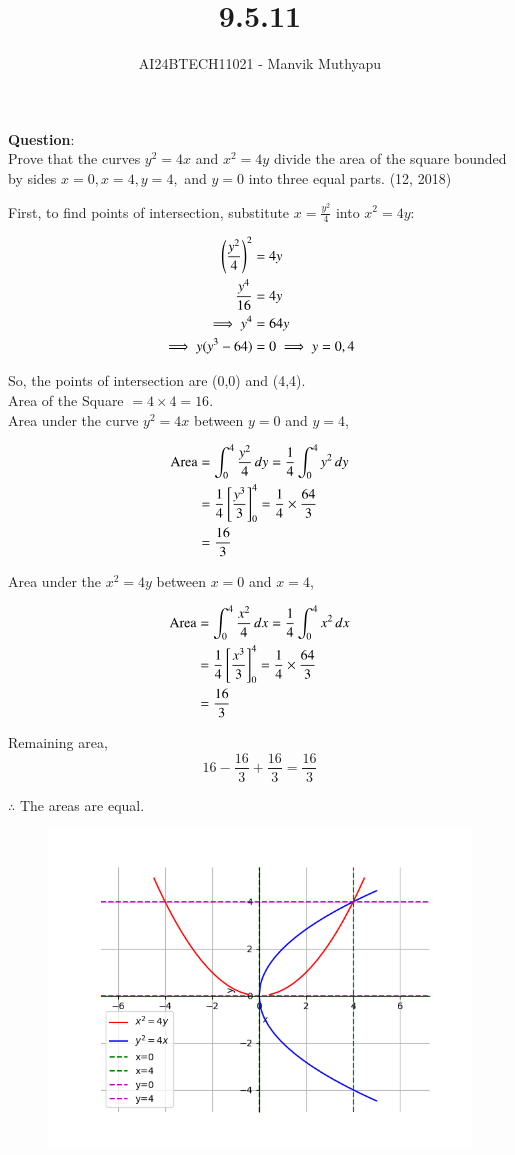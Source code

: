 \documentclass[journal,12pt,onecolumn]{IEEEtran}
\title{9.5.11}
\author{AI24BTECH11021 - Manvik Muthyapu}
\theoremstyle{remark}
\begin{document}


\maketitle
\bigskip

\renewcommand{\thefigure}{\theenumi}
\renewcommand{\thetable}{\theenumi}


\textbf{Question}:\\
Prove that the curves $y^2 = 4x$ and $x^2 = 4y$ divide the area of the square bounded by sides $x=0, x=4, y=4,$ and $y=0$ into three equal parts.
\hfill{(12, 2018)}

\solution
First, to find points of intersection, substitute $x = \frac{y^2}{4}$ into $x^2 = 4y$:

\begin{align}
	\left(\frac{y^2}{4}\right)^2 &= 4y \\
	\frac{y^4}{16} &= 4y \\
	\implies y^4 &= 64y \\
	\implies y(y^3 - 64) &= 0 \implies y = 0,4
\end{align}

So, the points of intersection are (0,0) and (4,4). \\
Area of the Square $= 4 \times 4 = 16$.\\ 
Area under the curve $y^2 = 4x$ between $y = 0$ and $y = 4$,

\begin{align}
	\text{Area} &= \int_0^4 \frac{y^2}{4} \, dy = \frac{1}{4} \int_0^4 y^2 \, dy \\
	&= \frac{1}{4} {}\left[\frac{y^3}{3}\right]_0^4 = \frac{1}{4} \times \frac{64}{3} \\
	&= \frac{16}{3}
\end{align}

Area under the $x^2 = 4y$ between $x = 0$ and $x = 4$,

\begin{align}
	\text{Area} &= \int_0^4 \frac{x^2}{4} \, dx = \frac{1}{4} \int_0^4 x^2 \, dx \\
	&= \frac{1}{4} {}\left[\frac{x^3}{3}\right]_0^4 = \frac{1}{4} \times \frac{64}{3} \\
	&= \frac{16}{3}
\end{align}

Remaining area,
$$16 - \frac{16}{3} + \frac{16}{3} = \frac{16}{3}$$

$\therefore$ The areas are equal.

\begin{figure}[h!]
	\centering
	\includegraphics[width=0.7\linewidth]{figs/plot.png}
\end{figure}
\end{document}
